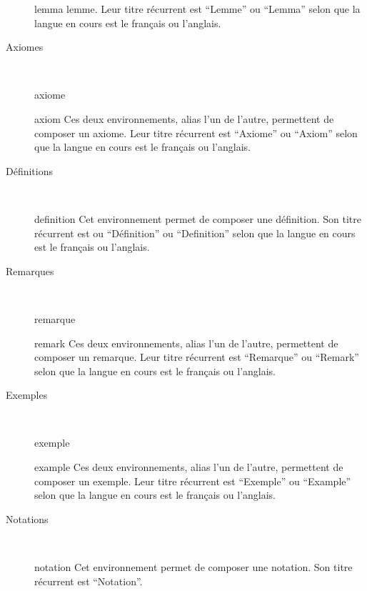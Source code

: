 \begin{description}
\begin{docEnvironment}{lemma}{}
    lemme. Leur titre récurrent est \enquote{Lemme} ou \enquote{Lemma} selon que
    la langue en cours est le français ou l'anglais.
  \end{docEnvironment}
\item[Axiomes] \
  \begin{docEnvironment}{axiome}{}
  \end{docEnvironment}
  \begin{docEnvironment}{axiom}{}
    Ces deux environnements, alias l'un de l'autre, permettent de composer un
    axiome. Leur titre récurrent est \enquote{Axiome} ou \enquote{Axiom} selon
    que la langue en cours est le français ou l'anglais.
  \end{docEnvironment}
\item[Définitions] \
  \begin{docEnvironment}{definition}{}
    Cet environnement permet de composer une définition. Son titre récurrent est
    ou \enquote{D\'efinition} ou \enquote{Definition} selon que la langue en
    cours est le français ou l'anglais.
  \end{docEnvironment}
\item[Remarques] \
  \begin{docEnvironment}{remarque}{}
  \end{docEnvironment}
  \begin{docEnvironment}{remark}{}
    Ces deux environnements, alias l'un de l'autre, permettent de composer un
    remarque. Leur titre récurrent est \enquote{Remarque} ou \enquote{Remark}
    selon que la langue en cours est le français ou l'anglais.
  \end{docEnvironment}
\item[Exemples] \
  \begin{docEnvironment}{exemple}{}
  \end{docEnvironment}
  \begin{docEnvironment}{example}{}
    Ces deux environnements, alias l'un de l'autre, permettent de composer un
    exemple. Leur titre récurrent est \enquote{Exemple} ou \enquote{Example}
    selon que la langue en cours est le français ou l'anglais.
  \end{docEnvironment}
\item[Notations] \
  \begin{docEnvironment}{notation}{}
    Cet environnement permet de composer une notation. Son titre récurrent est
    \enquote{Notation}.
  \end{docEnvironment}
\end{description}

